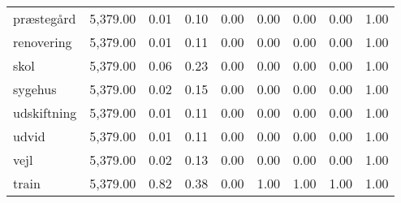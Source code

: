 \begin{tabular}{lllllllll}
præstegård & 5,379.00 & 0.01 & 0.10 & 0.00 & 0.00 & 0.00 & 0.00 & 1.00 \\
renovering & 5,379.00 & 0.01 & 0.11 & 0.00 & 0.00 & 0.00 & 0.00 & 1.00 \\
skol & 5,379.00 & 0.06 & 0.23 & 0.00 & 0.00 & 0.00 & 0.00 & 1.00 \\
sygehus & 5,379.00 & 0.02 & 0.15 & 0.00 & 0.00 & 0.00 & 0.00 & 1.00 \\
udskiftning & 5,379.00 & 0.01 & 0.11 & 0.00 & 0.00 & 0.00 & 0.00 & 1.00 \\
udvid & 5,379.00 & 0.01 & 0.11 & 0.00 & 0.00 & 0.00 & 0.00 & 1.00 \\
vejl & 5,379.00 & 0.02 & 0.13 & 0.00 & 0.00 & 0.00 & 0.00 & 1.00 \\
train & 5,379.00 & 0.82 & 0.38 & 0.00 & 1.00 & 1.00 & 1.00 & 1.00 \\
\end{tabular}

